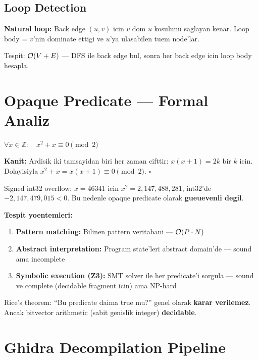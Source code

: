 \subsection{Loop Detection}

\textbf{Natural loop:} Back edge $(u, v)$ icin $v$ dom $u$ kosulunu saglayan kenar. Loop body = $v$'nin dominate ettigi ve $u$'ya ulasabilen tuem node'lar.

Tespit: $\mathcal{O}\!\left(V + E\right)$ --- DFS ile back edge bul, sonra her back edge icin loop body hesapla.


\section{Opaque Predicate --- Formal Analiz}
\label{sec:opaque-deep}

\begin{theorem}
$\forall x \in \mathbb{Z}: \quad x^2 + x \equiv 0 \pmod{2}$

\textbf{Kanit:} Ardisik iki tamsayidan biri her zaman cifttir: $x(x+1) = 2k$ bir $k$ icin. Dolayisiyla $x^2 + x = x(x+1) \equiv 0 \pmod{2}$. $\square$
\end{theorem}

\begin{uyari}[x*x >= 0 Tehlikesi]
Signed int32 overflow: $x = 46341$ icin $x^2 = 2{,}147{,}488{,}281$, int32'de $-2{,}147{,}479{,}015 < 0$. Bu nedenle  opaque predicate olarak \textbf{gueuevenli degil}.
\end{uyari}

\textbf{Tespit yoentemleri:}
\begin{enumerate}
\item \textbf{Pattern matching:} Bilinen pattern veritabani --- $\mathcal{O}\!\left(P \cdot N\right)$
\item \textbf{Abstract interpretation:} Program state'leri abstract domain'de --- sound ama incomplete
\item \textbf{Symbolic execution (Z3):} SMT solver ile her predicate'i sorgula --- sound ve complete (decidable fragment icin) ama NP-hard
\end{enumerate}

Rice's theorem: ``Bu predicate daima true mu?'' genel olarak \textbf{karar verilemez}. Ancak bitvector arithmetic (sabit genislik integer) \textbf{decidable}.


\section{Ghidra Decompilation Pipeline}
\label{sec:ghidra-deep}

